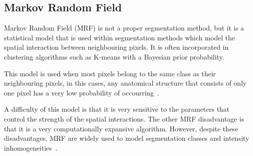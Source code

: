 \documentclass{standalone}
\begin{document}
	
\subsection{Markov Random Field}
	
	Markov Random Field (MRF) is not a proper segmentation method, but it is a statistical model that is used within segmentation methods which model the spatial interaction between neighbouring pixels. It is often incorporated in clustering algorithms such as K-means with a Bayesian prior probability.
		
	This model is used when most pixels belong to the same class as their neighbouring pixels, in this cases, any anatomical structure that consists of only one pixel has a very low probability of occourring~\cite{ART:Pham}.
	
	A difficulty of this model is that it is very sensitive to the parameters that control the strength of the spatial interactions. The other MRF disadvantage is that it is a very computationally expansive algorithm. However, despite these disadvantages, MRF are widely used to model segmentation classes and intensity inhomogeneities~\cite{ART:Pham}. 
		 
\end{document}
